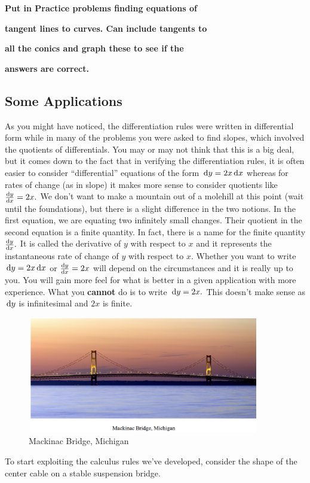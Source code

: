   \centerline{\bf\Large Put in Practice problems finding equations of}
  \centerline{\bf\Large  tangent lines to curves.  Can include tangents to}
  \centerline{\bf\Large  all the conics and graph these to see if the}
  \centerline{\bf\Large  answers are correct.}

\subsection{Some Applications}
As you might have noticed, the differentiation rules were written in
differential form while in many of the problems you were asked to find
slopes, which involved the quotients of differentials.  You may or may
not think that this is a big deal, but it comes down to the fact that
in verifying the differentiation rules, it is often easier to consider
``differential'' equations of the form $\thinspace{\rm d}y=2x \thinspace{\rm d}x$ whereas for rates of
change (as in slope) it makes more sense to consider quotients like
$\frac{\text{d}{y}}{\text{d}{x}}=2x.$  We don't want to make a mountain out of a molehill at this
point (wait until the foundations), but there is a slight difference
in the two notions.  In the first equation, we are equating two
infinitely small changes.  Their quotient in the second equation is a
finite quantity.  In fact, there is a name for the finite quantity
$\frac{\text{d}{y}}{\text{d}{x}}.$  It is called the derivative of $y$ with respect to $x$ and it
represents the instantaneous rate of change of $y$ with respect to $x.$
Whether you want to write $\thinspace{\rm d}y=2x\thinspace{\rm d}x$ or $\frac{\text{d}{y}}{\text{d}{x}}=2x$ will depend on the
circumstances and it is really up to you.  You will gain more feel for
what is better in a given application with more experience.  What you
{\bf{}cannot} do is to write $\thinspace{\rm d}y=2x.$  This doesn't make sense as $\thinspace{\rm d}y$ is
infinitesimal and $2x$ is finite.  

\begin{figure}
\captionsetup{labelformat=empty}
\centerline{\includegraphics*[height=2in,width=4in]{Figures/MackinacBridge1}}
\caption{Mackinac Bridge, Michigan}
\label{fig:}
\end{figure}
To start exploiting the calculus rules we've developed, consider the
shape of the center cable on a stable suspension bridge.

